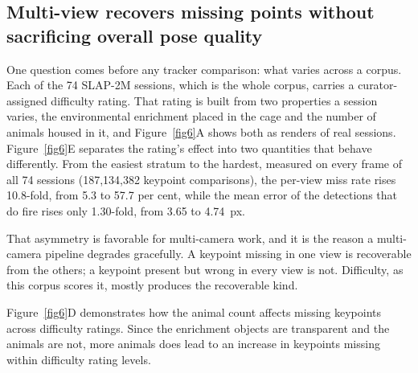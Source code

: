 \documentclass[pdflatex, sn-nature]{sn-jnl}
\theoremstyle{thmstyleone}%
\theoremstyle{thmstyletwo}%
\theoremstyle{thmstylethree}%
\begin{document}
\subsection{Multi-view recovers missing points without sacrificing overall pose quality}\label{subsec2-6}

One question comes before any tracker comparison: what varies across a corpus. Each of the 74 SLAP-2M sessions, which is the whole corpus, carries a curator-assigned difficulty rating. That rating is built from two properties a session varies, the environmental enrichment placed in the cage and the number of animals housed in it, and Figure~\ref{fig6}A shows both as renders of real sessions. Figure~\ref{fig6}E separates the rating's effect into two quantities that behave differently. From the easiest stratum to the hardest, measured on every frame of all 74 sessions (187,134,382 keypoint comparisons), the per-view miss rate rises 10.8-fold, from 5.3 to 57.7 per cent, while the mean error of the detections that do fire rises only 1.30-fold, from 3.65 to 4.74~px.

That asymmetry is favorable for multi-camera work, and it is the reason a multi-camera pipeline degrades gracefully. A keypoint missing in one view is recoverable from the others; a keypoint present but wrong in every view is not. Difficulty, as this corpus scores it, mostly produces the recoverable kind.

Figure~\ref{fig6}D demonstrates how the animal count affects missing keypoints across difficulty ratings. Since the enrichment objects are transparent and the animals are not, more animals does lead to an increase in keypoints missing within difficulty rating levels. 
\end{document}
